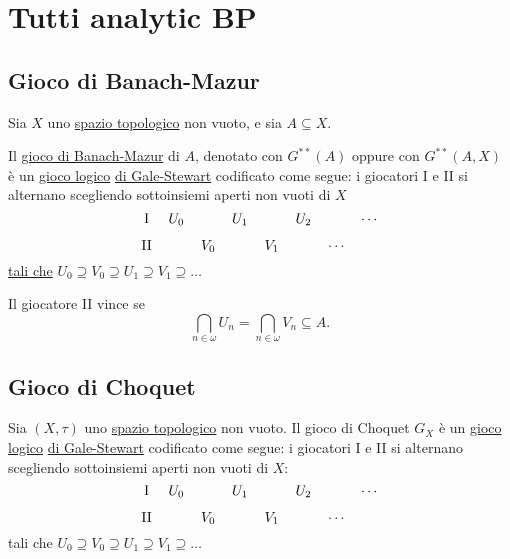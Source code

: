\documentclass{article}
\newcommand{\1}{\mathds{1}}
\begin{document}
\section{Tutti analytic BP}
\label{sec:orgb092fd1}

\subsection{Gioco di Banach-Mazur}
\label{sec:orge8e0b9e}
Sia \(X\) uno \href{../../../../../../../org/roam/20250103145124-topologia.org}{spazio topologico} non vuoto, e sia \(A \subseteq X\).

Il \uline{gioco di Banach-Mazur} di \(A\), denotato con \(G^{**}(A)\) oppure con \(G^{**}(A,X)\) è un \href{../../../../../../../org/roam/20250513155732-logic_game.org}{gioco logico} \hyperref[sec:org21a45cb]{di Gale-Stewart} codificato come segue: i giocatori I e II si alternano scegliendo sottoinsiemi aperti non vuoti di \(X\)
\begin{equation*}
\begin{tikzcd}[ampersand replacement=\&,cramped,sep=tiny]
	{\text{I}} \& {U_0} \&\& {U_1} \&\& {U_2} \&\& \cdots \\
	{\text{II}} \&\& {V_0} \&\& {V_1} \&\& \cdots
\end{tikzcd}
\end{equation*}
\hyperref[sec:org32c74c6]{tali che} \(U_{0}\supseteq V_{0}\supseteq U_{1}\supseteq V_{1}\supseteq \dots\)

Il giocatore II vince se
\begin{equation*}
\bigcap_{n \in \omega} U_{n} = \bigcap_{n \in \omega} V_{n} \subseteq A.
\end{equation*}
\subsection{Gioco di Choquet}
\label{sec:org9c9de7e}
Sia \((X,\tau)\) uno \href{../../../../../../../org/roam/20250103145124-topologia.org}{spazio topologico} non vuoto. Il gioco di Choquet \(G_{X}\) è un \href{../../../../../../../org/roam/20250513155732-logic_game.org}{gioco logico} \hyperref[sec:org21a45cb]{di Gale-Stewart} codificato come segue: i giocatori I e II si alternano scegliendo sottoinsiemi aperti non vuoti di \(X\):
\begin{equation*}
\begin{tikzcd}[ampersand replacement=\&,cramped,sep=tiny]
	{\text{I}} \& {U_0} \&\& {U_1} \&\& {U_2} \&\& \cdots \\
	{\text{II}} \&\& {V_0} \&\& {V_1} \&\& \cdots
\end{tikzcd}
\end{equation*}
tali che \(U_{0} \supseteq V_{0}\supseteq U_{1}\supseteq V_{1}\supseteq \dots\)
\end{document}
